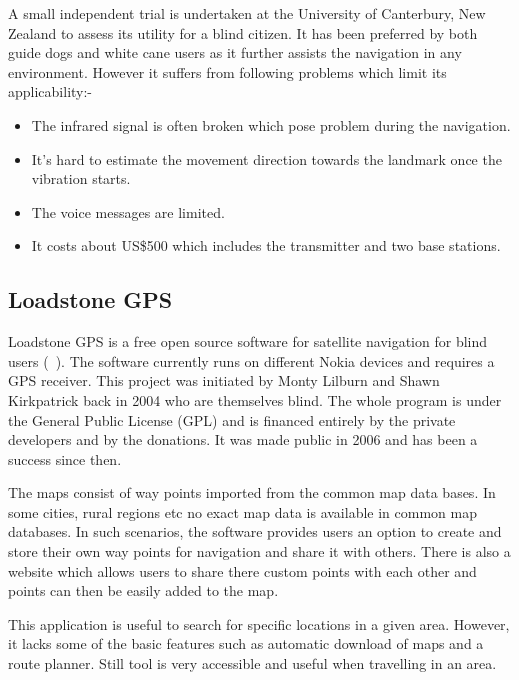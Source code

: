   
A small independent trial is undertaken at the 
University of Canterbury, New Zealand to assess its 
utility for a blind citizen. It has been preferred by both 
guide dogs and white cane users as it further assists 
the navigation in any environment. However it suffers 
from following problems which limit its applicability:-

\begin{itemize}
\item The infrared signal is often broken 
which pose problem during the navigation.

\item It's hard to estimate the 
movement direction towards the landmark 
once the vibration starts.

\item The voice messages are limited.

\item It costs about US\$500 which includes 
the transmitter and two base stations.
\end{itemize}


\subsection{Loadstone GPS}
\label{sec:loadstone}

Loadstone GPS is a free open source software 
for satellite navigation for blind users (~\citet{loadstone}). 
The software currently runs on different 
Nokia devices and requires a GPS receiver.
This project was initiated by Monty Lilburn and 
Shawn Kirkpatrick back in 2004 who are 
themselves blind. The whole program is under the 
General Public License (GPL) and is financed 
entirely by the private developers and by the donations. 
It was made public in 2006 and has been 
a success since then.

The maps consist of way points imported from 
the common map data bases. In some 
cities, rural regions etc no 
exact map data is available in 
common map databases. In such scenarios, 
the software provides users an option to 
create and store their own way points 
for navigation and share it with others. 
There is also a website which allows users 
to share there custom points with each other
and points can then be easily added to the map. 



This application is useful to search for specific locations 
in a given area. However, it lacks some of the 
basic features such as automatic download of maps 
and a route planner. Still tool is very accessible and 
useful when travelling in an area.
